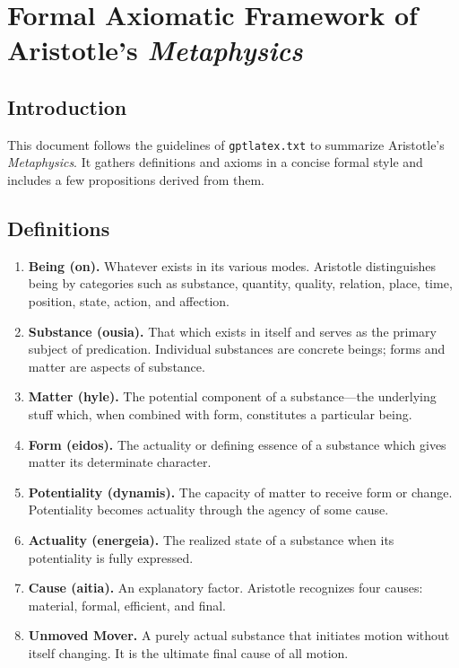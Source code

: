 \documentclass[11pt]{article}
\begin{document}
\section*{Formal Axiomatic Framework of Aristotle's \emph{Metaphysics}}

\subsection*{Introduction}
This document follows the guidelines of \texttt{gptlatex.txt} to summarize Aristotle's \emph{Metaphysics}. It gathers definitions and axioms in a concise formal style and includes a few propositions derived from them.

\subsection*{Definitions}
\begin{enumerate}
  \item \textbf{Being (on).} Whatever exists in its various modes. Aristotle distinguishes being by categories such as substance, quantity, quality, relation, place, time, position, state, action, and affection.
  \item \textbf{Substance (ousia).} That which exists in itself and serves as the primary subject of predication. Individual substances are concrete beings; forms and matter are aspects of substance.
  \item \textbf{Matter (hyle).} The potential component of a substance---the underlying stuff which, when combined with form, constitutes a particular being.
  \item \textbf{Form (eidos).} The actuality or defining essence of a substance which gives matter its determinate character.
  \item \textbf{Potentiality (dynamis).} The capacity of matter to receive form or change. Potentiality becomes actuality through the agency of some cause.
  \item \textbf{Actuality (energeia).} The realized state of a substance when its potentiality is fully expressed.
  \item \textbf{Cause (aitia).} An explanatory factor. Aristotle recognizes four causes: material, formal, efficient, and final.
  \item \textbf{Unmoved Mover.} A purely actual substance that initiates motion without itself changing. It is the ultimate final cause of all motion.
\end{enumerate}
\end{document}
